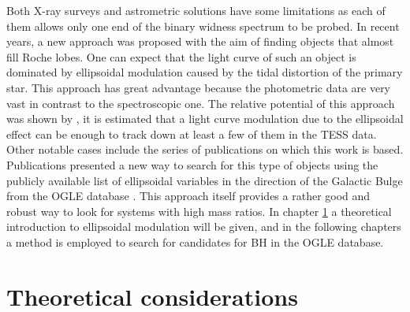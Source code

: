 \documentclass{pracalicmgr}
\begin{document}
Both X-ray surveys and astrometric solutions have some limitations as each of them allows only one end of the binary widness spectrum to be probed.
In recent years, a new approach was proposed with the aim of finding objects that almost fill Roche lobes. One can expect that the light curve of such an object
is dominated by ellipsoidal modulation caused by the tidal distortion of the primary star. This approach has great advantage because the photometric
data are very vast in contrast to the spectroscopic one.
The relative potential of this approach was shown by \citet{masuda_prospects_2019}, it is estimated that a light curve modulation due to the ellipsoidal effect can be enough to track down
at least a few of them in the TESS data. Other notable cases include the series of publications \citet{gomel_search_2021-1,gomel_search_2021-2,gomel_search_2021-3} on which this work is based.
Publications presented a new way to search for this type of objects using the publicly available list of ellipsoidal variables in the direction of the Galactic Bulge from the OGLE database \citep{soszynski_ogle_2016}. This approach itself provides a rather good and robust way to look for systems with high mass ratios. In chapter \ref{theo} a theoretical
introduction to ellipsoidal modulation will be given, and in the following chapters a method is employed to search for candidates for BH in the OGLE database.

\chapter{Theoretical considerations}\label{theo}
\end{document}
